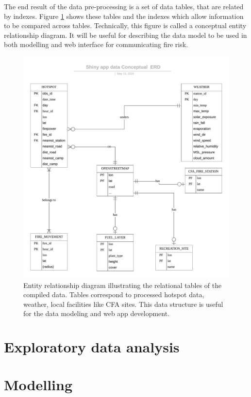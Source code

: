 \documentclass{monashthesis}
\begin{document}
The end result of the data pre-processing is a set of data tables, that are related by indexes. Figure \ref{fig:ERD} shows these tables and the indexes which allow information to be compared across tables. Technically, this figure is called a conceptual entity relationship diagram. It will be useful for describing the data model to be used in both modelling and web interface for communicating fire risk.

\begin{figure}
\centering
\includegraphics{figures/Shiny_app_data_Conceptual_ERD.jpeg}
\caption{Entity relationship diagram illustrating the relational tables of the compiled data. Tables correspond to processed hotspot data, weather, local facilities like CFA sites. This data structure is useful for the data modeling and web app development. \label{fig:ERD}}
\end{figure}

\hypertarget{exploratory-data-analysis}{%
\chapter{Exploratory data analysis}\label{exploratory-data-analysis}}

\hypertarget{modelling}{%
\chapter{Modelling}\label{modelling}}
\end{document}
